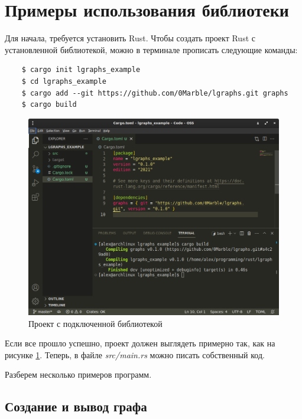 \section{Примеры использования библиотеки}

Для начала, требуется установить Rust. Чтобы создать проект Rust с установленной библиотекой,
можно в терминале прописать следующие команды:

\begin{verbatim}
    $ cargo init lgraphs_example
    $ cd lgraphs_example
    $ cargo add --git https://github.com/0Marble/lgraphs.git graphs
    $ cargo build
\end{verbatim}

\begin{figure}
    \centering
    \includegraphics[scale=0.4]{static_images/install_step3.png}
    \caption{Проект с подключенной библиотекой}
    \label{project-setup-image}
\end{figure}

Если все прошло успешно, проект должен выглядеть примерно так, как на рисунке \ref{project-setup-image}.
Теперь, в файле \emph{src/main.rs} можно писать собственный код.

Разберем несколько примеров программ.

\subsection{Создание и вывод графа}

\inputminted[linenos]{rust}{../lgraphs/examples/helloworld.rs} \label{helloworld-program}

